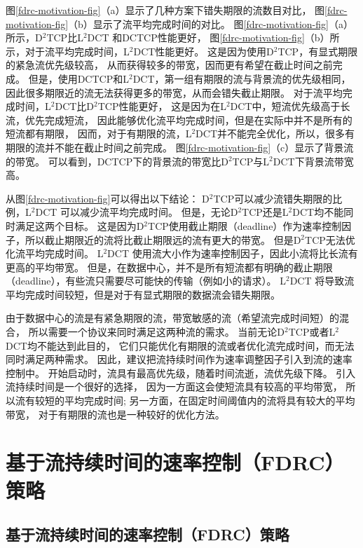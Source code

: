 图\ref{fdrc-motivation-fig}（a）显示了几种方案下错失期限的流数目对比，
图\ref{fdrc-motivation-fig}（b）显示了流平均完成时间的对比。
图\ref{fdrc-motivation-fig}（a）所示，D$^2$TCP比L$^2$DCT 和DCTCP性能更好，
图\ref{fdrc-motivation-fig}（b）所示，对于流平均完成时间，L$^2$DCT性能更好。
这是因为使用D$^2$TCP，有显式期限的紧急流优先级较高，
从而获得较多的带宽，因而更有希望在截止时间之前完成。
但是，使用DCTCP和L$^2$DCT，第一组有期限的流与背景流的优先级相同，
因此很多期限近的流无法获得更多的带宽，从而会错失截止期限。
对于流平均完成时间，L$^2$DCT比D$^2$TCP性能更好，
这是因为在L$^2$DCT中，短流优先级高于长流，优先完成短流，
因此能够优化流平均完成时间，但是在实际中并不是所有的短流都有期限，
因而，对于有期限的流，L$^2$DCT并不能完全优化，所以，很多有期限的流并不能在截止时间之前完成。
图\ref{fdrc-motivation-fig}（c）显示了背景流的带宽。
可以看到，DCTCP下的背景流的带宽比D$^2$TCP与L$^2$DCT下背景流带宽高。


从图\ref{fdrc-motivation-fig}可以得出以下结论：
D$^2$TCP可以减少流错失期限的比例，L$^2$DCT 可以减少流平均完成时间。
但是，无论D$^2$TCP还是L$^2$DCT均不能同时满足这两个目标。
这是因为D$^2$TCP使用截止期限（deadline）作为速率控制因子，所以截止期限近的流将比截止期限远的流有更大的带宽。
但是D$^2$TCP无法优化流平均完成时间。
L$^2$DCT 使用流大小作为速率控制因子，因此小流将比长流有更高的平均带宽。
但是，在数据中心，并不是所有短流都有明确的截止期限（deadline），有些流只需要尽可能快的传输（例如小的请求）。
L$^2$DCT 将导致流平均完成时间较短，但是对于有显式期限的数据流会错失期限。

由于数据中心的流是有紧急期限的流，带宽敏感的流（希望流完成时间短）的混合，
所以需要一个协议来同时满足这两种流的需求。
当前无论D$^2$TCP或者L$^2$DCT均不能达到此目的，
它们只能优化有期限的流或者优化流完成时间，而无法同时满足两种需求。
因此，建议把流持续时间作为速率调整因子引入到流的速率控制中。
开始启动时，流具有最高优先级，随着时间流逝，流优先级下降。
引入流持续时间是一个很好的选择，
因为一方面这会使短流具有较高的平均带宽，
所以流有较短的平均完成时间;
另一方面，在固定时间阈值内的流将具有较大的平均带宽，
对于有期限的流也是一种较好的优化方法。


\section{基于流持续时间的速率控制（FDRC）策略}

\subsection{基于流持续时间的速率控制（FDRC）策略}


